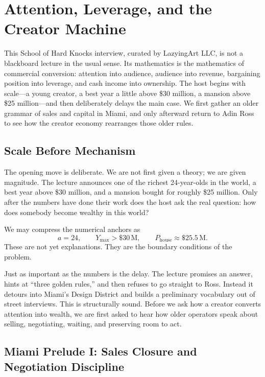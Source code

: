 \chapter{Attention, Leverage, and the Creator Machine}

This School of Hard Knocks interview, curated by LazyingArt LLC, is not a blackboard lecture in the usual sense. Its mathematics is the mathematics of commercial conversion: attention into audience, audience into revenue, bargaining position into leverage, and cash income into ownership. The host begins with scale---a young creator, a best year a little above \$30 million, a mansion above \$25 million---and then deliberately delays the main case. We first gather an older grammar of sales and capital in Miami, and only afterward return to Adin Ross to see how the creator economy rearranges those older rules.

\section{Scale Before Mechanism}

The opening move is deliberate. We are not first given a theory; we are given magnitude. The lecture announces one of the richest 24-year-olds in the world, a best year above \$30 million, and a mansion bought for roughly \$25 million. Only after the numbers have done their work does the host ask the real question: how does somebody become wealthy in this world?

We may compress the numerical anchors as
\begin{equation}
a = 24,\qquad Y_{\max} > \$30\,\mathrm{M},\qquad P_{\text{house}} \approx \$25.5\,\mathrm{M}.
\end{equation}
These are not yet explanations. They are the boundary conditions of the problem.

Just as important as the numbers is the delay. The lecture promises an answer, hints at ``three golden rules,'' and then refuses to go straight to Ross. Instead it detours into Miami's Design District and builds a preliminary vocabulary out of street interviews. This is structurally sound. Before we ask how a creator converts attention into wealth, we are first asked to hear how older operators speak about selling, negotiating, waiting, and preserving room to act.

\section{Miami Prelude I: Sales Closure and Negotiation Discipline}

